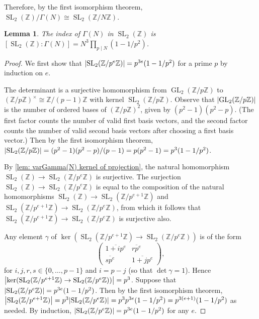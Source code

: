 \documentclass[10pt,leqno,twoside,b5paper]{article}
\theoremstyle{plain}
\newtheorem{lemma}[lem]{Lemma}
\theoremstyle{definition}
\numberwithin{equation}{section}
\numberwithin{lem}{section}
\DeclareMathOperator{\GL}{GL}
\DeclareMathOperator{\SL}{SL}
\newcommand{\slz}{\SL_2(\mathbb{Z})}
\begin{document}
Therefore, by the first isomorphism theorem, $\slz/\varGamma(N)\cong \SL_2(\mathbb{Z}/N\mathbb{Z})$. 
\begin{lemma}
    The index of $\varGamma(N)$ in $\slz$ is $[\slz: \varGamma(N)] = N^3\prod_{p\mid N}(1-1/p^2)$.
\end{lemma}
\begin{proof}
    We first show that $\abs{\SL_2(\mathbb{Z}/p^e\mathbb{Z})} = p^{3e}(1-1/p^2)$ for a prime $p$ by induction on $e$.

    The determinant is a surjective homomorphism from $\GL_2(\mathbb{Z}/p\mathbb{Z})$ to $(\mathbb{Z}/p\mathbb{Z})^\times\cong \mathbb{Z}/(p-1)\mathbb{Z}$ with kernel $\SL_2(\mathbb{Z}/p\mathbb{Z})$. Observe that $\abs{\GL_2(\mathbb{Z}/p\mathbb{Z})}$ is the number of ordered bases of $(\mathbb{Z}/p\mathbb{Z})^2$, given by $(p^2-1)(p^2-p)$. (The first factor counts the number of valid first basis vectors, and the second factor counts the number of valid second basis vectors after choosing a first basis vector.) Then by the first isomorphism theorem, $\abs{\SL_2(\mathbb{Z}/p\mathbb{Z})} = (p^2-1)(p^2-p)/(p-1) = p(p^2-1) = p^3(1-1/p^2)$.
    
    By \cref{lem: varGamma(N) kernel of projection}, the natural homomorphism $\slz\to \SL_2(\mathbb{Z}/p^e\mathbb{Z})$ is surjective. The surjection $\slz\to \SL_2(\mathbb{Z}/p^e\mathbb{Z})$ is equal to the composition of the natural homomorphisms $\slz\to \SL_2(\mathbb{Z}/p^{e+1}\mathbb{Z})$ and $\SL_2(\mathbb{Z}/p^{e+1}\mathbb{Z})\to \SL_2(\mathbb{Z}/p^e\mathbb{Z})$, from which it follows that $\SL_2(\mathbb{Z}/p^{e+1}\mathbb{Z})\to \SL_2(\mathbb{Z}/p^e\mathbb{Z})$ is surjective also.

    Any element $\gamma$ of $\ker(\SL_2(\mathbb{Z}/p^{e+1}\mathbb{Z})\to \SL_2(\mathbb{Z}/p^e\mathbb{Z}))$ is of the form
    \[\begin{pmatrix}
        \overline{1+ip^e} & \overline{rp^e} \\ \overline{sp^e} & \overline{1+jp^e}
    \end{pmatrix},\] for $i,j,r,s\in \{0,\dots,p-1\}$ and $i = p-j$ (so that $\det \gamma = 1$). Hence $\abs{\ker(\SL_2(\mathbb{Z}/p^{e+1}\mathbb{Z})\to \SL_2(\mathbb{Z}/p^e\mathbb{Z}))} = p^3$. Suppose that $\abs{\SL_2(\mathbb{Z}/p^e\mathbb{Z})} = p^{3e}(1-1/p^2)$. Then by the first isomorphism theorem, $\abs{\SL_2(\mathbb{Z}/p^{e+1}\mathbb{Z})} = p^3\abs{\SL_2(\mathbb{Z}/p^e\mathbb{Z})} = p^3p^{3e}(1-1/p^2) = p^{3(e+1)}(1-1/p^2)$ as needed. By induction, $\abs{\SL_2(\mathbb{Z}/p^e\mathbb{Z})} = p^{3e}(1-1/p^2)$ for any $e$.


\end{proof}
\end{document}
